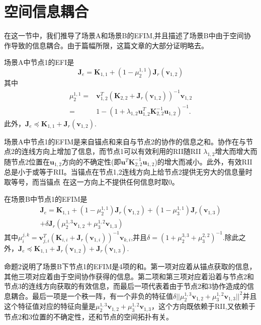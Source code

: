 \section{空间信息耦合}
在这一节中，我们推导了场景A和场景B的EFIM,并且描述了场景B中由于空间协作导致的信息耦合。由于篇幅所限，这篇文章的大部分证明略去。
\begin{proposition}
场景A中节点1的EFI是
\[
\bm{J}_e=\bm{K}_{1,1}+(1-\mu_2^{1,1})\bm{J}_r(\bm{v}_{1,2})
\]
其中
\begin{eqnarray*}
\mu_2^{1,1}=&\bm{v}^T_{1,2}(\bm{K}_{2,2}+\bm{J}_r(\bm{v}_{1,2}))^{-1}\bm{v}_{1,2}\\
=&1-(1+\lambda_{1,2}\bm{u}^T_{1,2}\bm{K}^{-1}_{2,2}\bm{u}_{1,2})^{-1}.
\end{eqnarray*}
此外，$\bm{J}_e \preceq \bm{K}_{1,1}+\bm{J}_r(\bm{v}_{1,2}).$
\end{proposition}
\begin{remark}
场景A中节点1的EFIM是来自锚点和来自与节点2的协作的信息之和。协作在与节点2的连线方向上增加了信息，而节点1可以有效利用的RII随RII $\lambda_{1,2}$增大而增大而随节点2位置在$\bm{u}_{1,2}$方向的不确定性(即$\bm{u}^T\bm{K}^{-1}_{2,2}\bm{u}_{1,2}$)的增大而减小。此外，有效RII总是小于或等于RII。当锚点在节点1,2连线方向上给节点2提供无穷大的信息量时取等号，而当锚点
在这一方向上不提供任何信息时取0。
\end{remark}
\begin{proposition}
在场景B中节点1的EFIM是
\begin{equation}
\begin{split}
\bm{J}_e=\bm{K}_{1,1}+(1-\mu_2^{1,1})\bm{J}_r(\bm{v}_{1,2})+(1-\mu_3^{1,1})\bm{J}_r(\bm{v}_{1,3})\\
+\delta\bm{J}_r(\mu_2^{1,3}\bm{v}_{1,2}+\mu_3^{1,2}\bm{v}_{1,3})
\end{split}
\end{equation}
其中$\mu_i^{j,k}=\bm{v}^T_{j,i}(\bm{K}_{i,i}+\bm{J}_r(\bm{v}_{1,i}))^{-1}\bm{v}_{k,i}$,并且$\delta=(1+\mu_2^{3,3}+\mu_3^{2,2})^{-1}$.除此之外，$\bm{J}_e \preceq \bm{K}_{1,1}+\bm{J}_r(\bm{v}_{1,2})+\bm{J}_r(\bm{v}_{1,3})$.
\end{proposition}
\begin{remark}
命题2说明了场景B下节点1的EFIM是4项的和。第一项对应着从锚点获取的信息，其他三项对应着由于空间协作获得的信息。第二项和第三项对应着沿着与节点2和节点3的连线方向获取的有效信息，而最后一项代表着由于节点2和3协作造成的信息耦合。最后一项是一个秩一阵，有一个非负的特征值$\delta ||\mu_2^{1,3}\bm{v}_{1,2}+\mu_3^{1,2}\bm{v}_{1,3}||^2$并且这个特征值对应的特征向量是$\mu_2^{1,3}\bm{v}_{1,2}+\mu_3^{1,2}\bm{v}_{1,3}$，这个方向既依赖于RII,又依赖于节点2和3位置的不确定性，还和节点的空间拓扑有关。
\end{remark}
